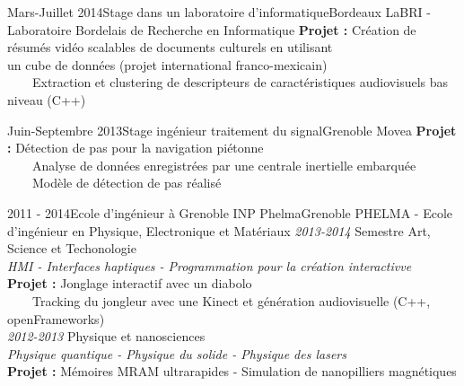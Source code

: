 \documentclass[a4paper]{genard-cv}
\begin{document}
\begin{body}
		\begin{entry}
			{Mars-Juillet 2014}{Stage dans un laboratoire d'informatique}{Bordeaux}
			{LaBRI - Laboratoire Bordelais de Recherche en Informatique}
			\textbf{Projet :} Création de résumés vidéo scalables de documents culturels en utilisant\\
			un cube de données (projet international franco-mexicain)\\
			~~~~Extraction et clustering de descripteurs de caractéristiques audiovisuels bas niveau (C++)\\
		\end{entry}

		\begin{entry}
			{Juin-Septembre 2013}{Stage ingénieur traitement du signal}{Grenoble}
			{Movea}
			\textbf{Projet :} Détection de pas pour la navigation piétonne\\
			~~~~Analyse de données enregistrées par une centrale inertielle embarquée\\
			~~~~Modèle de détection de pas réalisé
		\end{entry}

	\education
		\begin{entry}
			{2011 - 2014}{Ecole d'ingénieur à Grenoble INP Phelma}{Grenoble}
			{PHELMA - Ecole d'ingénieur en Physique, Electronique et Matériaux}
			\textit{2013-2014} Semestre Art, Science et Techonologie\\
			\textit{HMI - Interfaces haptiques - Programmation pour la création interactivve}\\
			\textbf{Projet :} Jonglage interactif avec un diabolo\\
      ~~~~Tracking du jongleur avec une Kinect et génération audiovisuelle (C++, openFrameworks)
			\medskip\\

			\textit{2012-2013} Physique et nanosciences\\
			\textit{Physique quantique - Physique du solide - Physique des lasers}\\
			\textbf{Projet :} Mémoires MRAM ultrarapides - Simulation de nanopilliers magnétiques
			\medskip\\


\end{entry}
\end{body}
\end{document}
